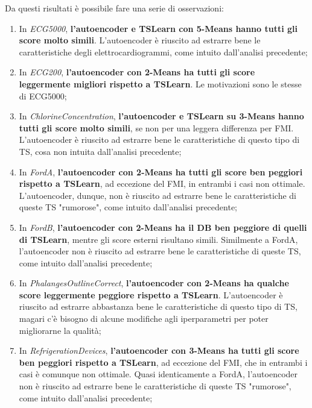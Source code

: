 Da questi risultati è possibile fare una serie di osservazioni:
\begin{enumerate}
	\item In \textit{ECG5000}, \textbf{l'autoencoder e TSLearn con 5-Means hanno tutti gli score molto simili}.
	L'autoencoder è riuscito ad estrarre bene le caratteristiche degli elettrocardiogrammi, come intuito dall'analisi precedente;

	\item In \textit{ECG200}, \textbf{l'autoencoder con 2-Means ha tutti gli score leggermente migliori rispetto a TSLearn}.
	Le motivazioni sono le stesse di ECG5000;

	\item In \textit{ChlorineConcentration}, \textbf{l'autoencoder e TSLearn su 3-Means hanno tutti gli score molto simili}, se non per una leggera differenza per FMI.
	L'autoencoder è riuscito ad estrarre bene le caratteristiche di questo tipo di TS, cosa non intuita dall'analisi precedente;

	\item In \textit{FordA}, \textbf{l'autoencoder con 2-Means ha tutti gli score ben peggiori rispetto a TSLearn}, ad eccezione del FMI, in entrambi i casi non ottimale. L'autoencoder, dunque, non è riuscito ad estrarre bene le caratteristiche di queste TS "rumorose", come intuito dall'analisi precedente;

	\item In \textit{FordB}, \textbf{l'autoencoder con 2-Means ha il DB ben peggiore di quelli di TSLearn}, mentre gli score esterni risultano simili.
	Similmente a FordA, l'autoencoder non è riuscito ad estrarre bene le caratteristiche di queste TS, come intuito dall'analisi precedente;

	\item In \textit{PhalangesOutlineCorrect}, \textbf{l'autoencoder con 2-Means ha qualche score leggermente peggiore rispetto a TSLearn}.
	L'autoencoder è riuscito ad estrarre abbastanza bene le caratteristiche di questo tipo di TS, magari c'è bisogno di alcune modifiche agli iperparametri per poter migliorarne la qualità;

	\item In \textit{RefrigerationDevices}, \textbf{l'autoencoder con 3-Means ha tutti gli score ben peggiori rispetto a TSLearn}, ad eccezione del FMI, che in entrambi i casi è comunque non ottimale.
	Quasi identicamente a FordA, l'autoencoder non è riuscito ad estrarre bene le caratteristiche di queste TS "rumorose", come intuito dall'analisi precedente;


\end{enumerate}
